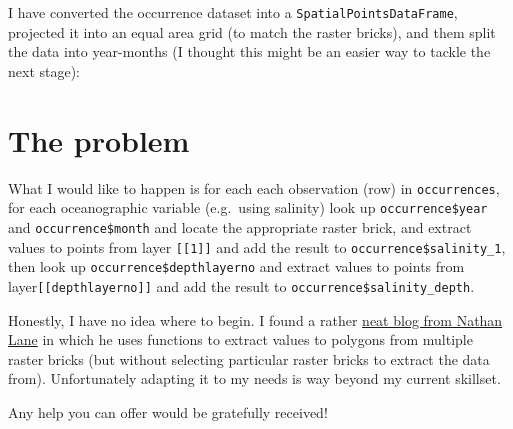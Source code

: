 \documentclass[]{article}
\newenvironment{Shaded}{\begin{snugshade}}{\end{snugshade}}
\newcommand{\KeywordTok}[1]{\textcolor[rgb]{0.13,0.29,0.53}{\textbf{#1}}}
\newcommand{\DataTypeTok}[1]{\textcolor[rgb]{0.13,0.29,0.53}{#1}}
\newcommand{\StringTok}[1]{\textcolor[rgb]{0.31,0.60,0.02}{#1}}
\newcommand{\CommentTok}[1]{\textcolor[rgb]{0.56,0.35,0.01}{\textit{#1}}}
\newcommand{\OperatorTok}[1]{\textcolor[rgb]{0.81,0.36,0.00}{\textbf{#1}}}
\newcommand{\NormalTok}[1]{#1}
\begin{document}
I have converted the occurrence dataset into a
\texttt{SpatialPointsDataFrame}, projected it into an equal area grid
(to match the raster bricks), and them split the data into year-months
(I thought this might be an easier way to tackle the next stage):

\begin{Shaded}
\end{Shaded}

\section{The problem}\label{the-problem}

What I would like to happen is for each each observation (row) in
\texttt{occurrences}, for each oceanographic variable (e.g.~using
salinity) look up \texttt{occurrence\$year} and
\texttt{occurrence\$month} and locate the appropriate raster brick, and
extract values to points from layer \texttt{{[}{[}1{]}{]}} and add the
result to \texttt{occurrence\$salinity\_1}, then look up
\texttt{occurrence\$depthlayerno} and extract values to points from
layer\texttt{{[}{[}depthlayerno{]}{]}} and add the result to
\texttt{occurrence\$salinity\_depth}.

Honestly, I have no idea where to begin. I found a rather
\href{http://nathanlane.info/tutorial/2016/01/02/gisfunctional.html}{neat
blog from Nathan Lane} in which he uses functions to extract values to
polygons from multiple raster bricks (but without selecting particular
raster bricks to extract the data from). Unfortunately adapting it to my
needs is way beyond my current skillset.

Any help you can offer would be gratefully received!
\end{document}
